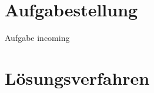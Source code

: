 \section{Aufgabestellung}
\huge
\begin{center}
    Aufgabe incoming
\end{center}

\pagebreak

\section{Lösungsverfahren}
